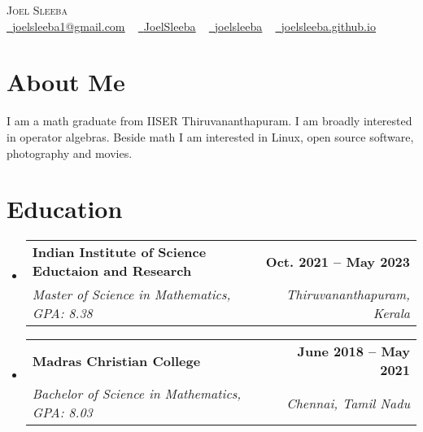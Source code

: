 \documentclass[letterpaper,11pt]{article}
\makeatletter
\newcommand{\resumeSubheading}[4]{
  \vspace{-2pt}\item
    \begin{tabular*}{1.0\textwidth}[t]{l@{\extracolsep{\fill}}r}
      \textbf{#1} & \textbf{\small #2} \\
      \textit{\small#3} & \textit{\small #4} \\
    \end{tabular*}\vspace{-7pt}
}
\newcommand{\resumeSubHeadingListStart}{\begin{itemize}[leftmargin=0.0in, label={}]}
\newcommand{\resumeSubHeadingListEnd}{\end{itemize}}
\makeatother
\begin{document}

\begin{center}
    {\Huge \scshape Joel Sleeba} \\ \vspace{5pt}
    \small \href{mailto:joelsleeba1@gmail.com}{\raisebox{-0.2\height}\faEnvelope\  \ul{joelsleeba1@gmail.com}} ~ 
    \href{https://twitter.com/JoelSleeba/}{\raisebox{-0.2\height}\faTwitter\ \ul{JoelSleeba}}  ~
    \href{https://github.com/joelsleeba}{\raisebox{-0.2\height}\faGithub\ \ul{joelsleeba}} ~
    \href{https://joelsleeba.github.io/}{\raisebox{-0.2\height}\faGlobe\ \ul{joelsleeba.github.io}}

    \vspace{-5pt}
\end{center}

\hypersetup{
  urlcolor=cyan
  }

\section{About Me}
I am a math graduate from IISER Thiruvananthapuram. I am broadly interested in operator algebras. Beside math I am interested in Linux, open source software, photography and movies.
\vspace{-5pt}

\section{Education}
  \resumeSubHeadingListStart
    \resumeSubheading
      {Indian Institute of Science Eductaion and Research}{Oct. 2021 -- May 2023}
      {Master of Science in Mathematics, GPA: 8.38}{Thiruvananthapuram, Kerala}
  \resumeSubHeadingListEnd
  \vspace{-12pt}
  \resumeSubHeadingListStart
    \resumeSubheading
      {Madras Christian College}{June 2018 -- May 2021}
      {Bachelor of Science in Mathematics, GPA: 8.03}{Chennai, Tamil Nadu}
  \resumeSubHeadingListEnd
  \vspace{-8pt}
\end{document}
